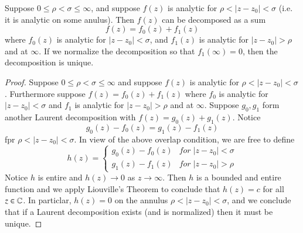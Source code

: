 \documentclass[12pt, a4paper, oneside, openright, titlepage]{book}
\begin{document}
\begin{namthm}
    Suppose $0 \leq \rho < \sigma \leq \infty$, and suppose $f(z)$ is analytic for $\rho < |z-z_0| < \sigma$ (i.e. it is analytic on some anulus). Then $f(z)$ can be decomposed as a sum \begin{equation*}
        f(z) = f_0(z) + f_1(z)
    \end{equation*}
    where $f_0(z)$ is analytic for $|z-z_0| < \sigma$, and $f_1(z)$ is analytic for $|z-z_0| > \rho$ and at $\infty$. If we normalize the decomposition so that $f_1(\infty) = 0$, then the decomposition is unique.
\end{namthm}
\begin{proof}
    Suppose $0 \leq \rho < \sigma \leq \infty$ and suppose $f(z)$ is analytic for $\rho < |z-z_0| < \sigma$. Furthermore suppose $f(z) = f_0(z)+f_1(z)$ where $f_0$ is analytic for $|z-z_0| < \sigma$ and $f_1$ is analytic for $|z-z_0| > \rho$ and at $\infty$. Suppose $g_0,g_1$ form another Laurent decomposition with $f(z) = g_0(z) + g_1(z)$. Notice \begin{equation*}
        g_0(z) - f_0(z) = g_1(z) - f_1(z)
    \end{equation*}
    fpr $\rho < |z-z_0| < \sigma$. In view of the above overlap condition, we are free to define \begin{equation*}
        h(z) = \left\{\begin{array}{lc} g_0(z) - f_0(z) & for\;|z-z_0| < \sigma \\ g_1(z) - f_1(z) & for\;|z-z_0| > \rho \end{array}\right.
    \end{equation*}
    Notice $h$ is entire and $h(z)\rightarrow 0$ as $z\rightarrow \infty$. Then $h$ is a bounded and entire function and we apply Liouville's Theorem to conclude that $h(z) = c$ for all $z \in \mathbb C$. In particlar, $h(z) = 0$ on the annulus $\rho < |z-z_0| < \sigma$, and we conclude that if a Laurent decomposition exists (and is normalized) then it must be unique.


\end{proof}
\end{document}
